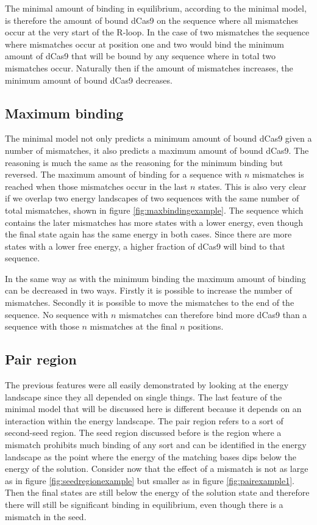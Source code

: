 
The minimal amount of binding in equilibrium, according to the minimal model, is therefore the amount of bound dCas9 on the sequence where all mismatches occur at the very start of the R-loop. In the case of two mismatches the sequence where mismatches occur at position one and two would bind the minimum amount of dCas9 that will be bound by any sequence where in total two mismatches occur. Naturally then if the amount of mismatches increases, the minimum amount of bound dCas9 decreases.


\subsection{Maximum binding}
The minimal model not only predicts a minimum amount of bound dCas9 given a number of mismatches, it also predicts a maximum amount of bound dCas9. The reasoning is much the same as the reasoning for the minimum binding but reversed. The maximum amount of binding for a sequence with $n$ mismatches is reached when those mismatches occur in the last $n$ states. This is also very clear if we overlap two energy landscapes of two sequences with the same number of total mismatches, shown in figure \ref{fig:maxbindingexample}. The sequence which contains the later mismatches has more states with a lower energy, even though the final state again has the same energy in both cases. Since there are more states with a lower free energy, a higher fraction of dCas9 will bind to that sequence.


In the same way as with the minimum binding the maximum amount of binding can be decreased in two ways. Firstly it is possible to increase the number of mismatches. Secondly it is possible to move the mismatches to the end of the sequence. No sequence with $n$ mismatches can therefore bind more dCas9 than a sequence with those $n$ mismatches at the final $n$ positions.

\subsection{Pair region}
\label{sec:TheoryPair}

The previous features were all easily demonstrated by looking at the energy landscape since they all depended on single things. The last feature of the minimal model that will be discussed here is different because it depends on an interaction within the energy landscape. The pair region refers to a sort of second-seed region. The seed region discussed before is the region where a mismatch prohibits much binding of any sort and can be identified in the energy landscape as the point where the energy of the matching bases dips below the energy of the solution. Consider now that the effect of a mismatch is not as large as in figure \ref{fig:seedregionexample} but smaller as in figure \ref{fig:pairexample1}. Then the final states are still below the energy of the solution state and therefore there will still be significant binding in equilibrium, even though there is a mismatch in the seed.

